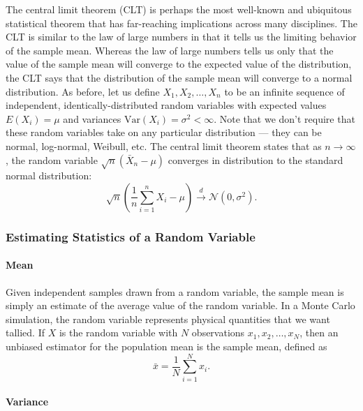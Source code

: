 The central limit theorem (CLT) is perhaps the most well-known and ubiquitous
statistical theorem that has far-reaching implications across many
disciplines. The CLT is similar to the law of large numbers in that it tells us
the limiting behavior of the sample mean. Whereas the law of large numbers tells
us only that the value of the sample mean will converge to the expected value of
the distribution, the CLT says that the distribution of the sample mean will
converge to a normal distribution. As before, let us define $X_1, X_2, \dots,
X_n$ to be an infinite sequence of independent, identically-distributed random
variables with expected values $E(X_i) = \mu$ and variances $\text{Var} (X_i) =
\sigma^2 < \infty$. Note that we don't require that these random variables take
on any particular distribution --- they can be normal, log-normal, Weibull,
etc. The central limit theorem states that as $n \rightarrow \infty$, the random
variable $\sqrt{n} (\bar{X}_n - \mu)$ converges in distribution to the standard
normal distribution:
\begin{equation}
  \label{eq:central-limit-theorem}
  \sqrt{n} \left ( \frac{1}{n} \sum_{i=1}^n X_i - \mu \right ) \xrightarrow{d}
  \mathcal{N} (0, \sigma^2).
\end{equation}

\subsubsection{Estimating Statistics of a Random Variable}

\paragraph{Mean}

Given independent samples drawn from a random variable, the sample mean is
simply an estimate of the average value of the random variable. In a Monte Carlo
simulation, the random variable represents physical quantities that we want
tallied. If $X$ is the random variable with $N$ observations
$x_1, x_2, \dots, x_N$, then an unbiased estimator for the population mean
is the sample mean, defined as
\begin{equation}
  \label{eq:sample-mean}
  \bar{x} = \frac{1}{N} \sum_{i=1}^N x_i.
\end{equation}

\paragraph{Variance}

